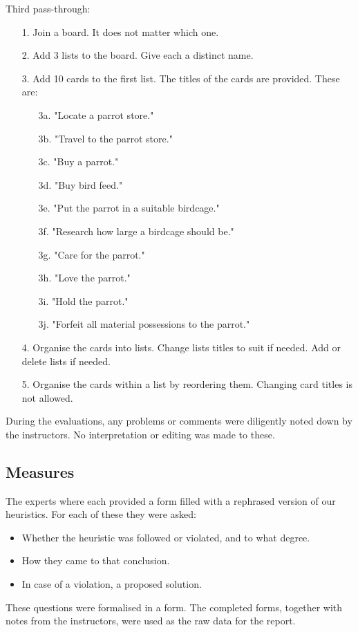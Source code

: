 Third pass-through:
\begin{itemize}
    \item [1.] Join a board. It does not matter which one.
    \item [2.] Add 3 lists to the board. Give each a distinct name.
    \item [3.] Add 10 cards to the first list. The titles of the cards are provided. These are:
    \begin{itemize}
        \item [3a.] "Locate a parrot store."
        \item [3b.] "Travel to the parrot store."
        \item [3c.] "Buy a parrot."
        \item [3d.] "Buy bird feed."
        \item [3e.] "Put the parrot in a suitable birdcage."
        \item [3f.] "Research how large a birdcage should be."
        \item [3g.] "Care for the parrot."
        \item [3h.] "Love the parrot."
        \item [3i.] "Hold the parrot."
        \item [3j.] "Forfeit all material possessions to the parrot."
    \end{itemize}
    \item [4.] Organise the cards into lists. Change lists titles to suit if needed. Add or delete lists if needed.
    \item [5.] Organise the cards within a list by reordering them. Changing card titles is not allowed.
\end{itemize}

During the evaluations, any problems or comments were diligently noted down by the instructors. No interpretation or editing was made to these. 

\subsection{Measures}

The experts where each provided a form filled with a rephrased version of our heuristics. For each of these they were asked:

\begin{itemize}
    \item Whether the heuristic was followed or violated, and to what degree.
    \item How they came to that conclusion.
    \item In case of a violation, a proposed solution.
\end{itemize}

These questions were formalised in a form. The completed forms, together with notes from the instructors, were used as the raw data for the report.


